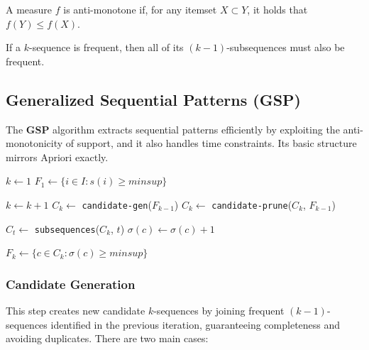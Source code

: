 \begin{definition}
A measure $f$ is anti-monotone if, for any itemset $X \subset Y$, it holds that $f(Y) \leq f(X)$.
\end{definition}

\begin{definition}
If a $k$-sequence is frequent, then all of its $(k-1)$-subsequences must also be frequent.
\end{definition}


\subsection{Generalized Sequential Patterns (GSP)}

The \textbf{GSP} algorithm extracts sequential patterns efficiently by exploiting the anti-monotonicity of support, and it also handles time constraints. Its basic structure mirrors Apriori exactly.
\begin{algorithm}
\caption{Generalized Sequential Patterns (GSP)}
\begin{algorithmic}[1]
    \State $k \gets 1$
    \State $F_1 \gets \{ i \in I : s(i) \geq minsup \}$ 
    
    \Repeat
        \State $k \gets k + 1$
        \State $C_k \gets$ \texttt{candidate-gen}($F_{k-1}$) 
        \State $C_k \gets$ \texttt{candidate-prune}($C_k$, $F_{k-1}$) 

            \State $C_t \gets$ \texttt{subsequences}($C_k$, $t$) 
                \State $\sigma(c) \gets \sigma(c) + 1$ 
            \EndFor
        \EndFor

        \State $F_k \gets \{ c \in C_k : \sigma(c) \geq minsup \}$ 
\end{algorithmic}
\end{algorithm}

\subsubsection{Candidate Generation}

This step creates new candidate $k$-sequences by joining frequent $(k{-}1)$-sequences identified in the previous iteration, guaranteeing completeness and avoiding duplicates. There are two main cases:

